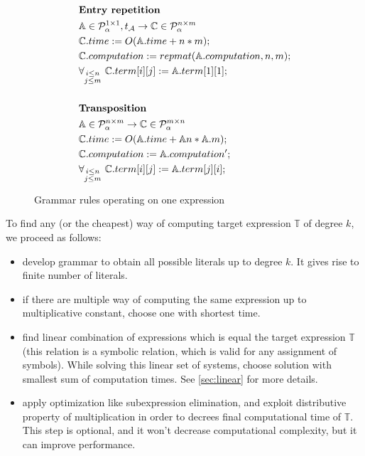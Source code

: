 \begin{figure}
\begin{framed}
\begin{align*}
& \\
&\text{{\bf Entry repetition}}\\
&\mathbb{A} \in \mathcal{P}^{1 \times 1}_\alpha, t_\mathcal{A} \rightarrow \mathbb{C} \in \mathcal{P}^{n \times m}_\alpha \\
&\mathbb{C}.time := O(\mathbb{A}.time + n * m);\\
&\mathbb{C}.computation := repmat(\mathbb{A}.computation, n, m); \\
&\forall_{\substack{i \leq n\\ j \leq m}}\text{ } \mathbb{C}.term[i][j] := \mathbb{A}.term[1][1];\\
& \\
&\text{{\bf Transposition}}\\
&\mathbb{A} \in \mathcal{P}^{n \times m}_\alpha \rightarrow \mathbb{C} \in \mathcal{P}^{m \times n}_\alpha\\
&\mathbb{C}.time := O(\mathbb{A}.time + \mathbb{A}n * \mathbb{A}.m);\\
&\mathbb{C}.computation := \mathbb{A}.computation';\\
&\forall_{\substack{i \leq n\\j \leq m}}\text{ } \mathbb{C}.term[i][j] := \mathbb{A}.term[j][i];
\end{align*}
\caption{Grammar rules operating on one expression}
\end{framed}
\end{figure}


To find any (or the cheapest) way of computing target expression $\mathbb{T}$ of degree $k$, we proceed as follows: 
\begin{itemize}
\item develop grammar to obtain all possible literals up to degree $k$. It gives rise to finite number of literals. 
\item if there are multiple way of computing the same expression up to multiplicative constant, choose one with shortest time.
\item find linear combination of expressions which is equal the target
  expression $\mathbb{T}$ (this relation is a symbolic relation, which
  is valid for any assignment of symbols). While solving this linear
  set of systems, choose solution with smallest sum of computation
  times. See \ref{sec:linear} for more details.
\item apply optimization like subexpression elimination, and exploit distributive property of multiplication in order to decrees final computational time of $\mathbb{T}$. This step is optional, and it won't decrease computational complexity, but it can improve performance.
\end{itemize}

